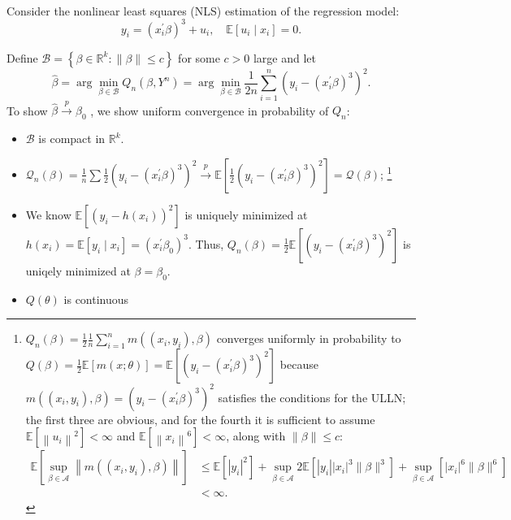 \begin{eg}
    \

    Consider the nonlinear least squares (NLS) estimation of the regression model:
    \[y_{i}=\left(x_{i}^{\prime} \beta\right)^{3}+u_{i}, \quad \mathbb{E}\left[u_{i} \mid x_{i}\right]=0 .\]

    Define  $\mathscr{B}=\left\{\beta \in \mathbb{R}^{k}:\|\beta\| \leq c\right\}$ for some $c>0$ large and let
    \[
    \hat{\beta}=\arg \min _{\beta \in \mathscr{B}} Q_{n}\left(\beta, Y^{n}\right)=\arg \min _{\beta \in \mathcal{B}} \frac{1}{2 n} \sum_{i=1}^{n}\left(y_{i}-\left(x_{i}^{\prime} \beta\right)^{3}\right)^{2} .
    \]
    To show  $\hat{\beta} \xrightarrow{p} \beta_{0}$ , we show uniform convergence in probability of  $Q_{n}$:
    \begin{itemize}
        \item $\mathscr{B}$  is compact in $\mathbb{R}^{k}$.
        \item $\mathcal{Q}_n(\beta) = \frac{1}{n} \sum \frac{1}{2} \left(y_i - (x_i^{\prime} \beta)^3\right)^2 \overset{p}{\rightarrow} \mathbb{E}\left[\frac{1}{2} \left(y_i - (x_i^{\prime} \beta)^3\right)^2 \right] = \mathcal{Q} (\beta)$;
        \footnote{$Q_{n}(\beta)=\frac{1}{2} \frac{1}{n} \sum_{i=1}^{n} m\left(\left(x_{i}, y_{i}\right), \beta\right)$ converges uniformly in probability to 
        $Q(\beta)=\frac{1}{2} \mathbb{E}[m(x ; \theta)]=   \mathbb{E}\left[\left(y_{i}-\left(x_{i}^{\prime} \beta\right)^{3}\right)^{2}\right]$
        because $m\left(\left(x_{i}, y_{i}\right), \beta\right)=\left(y_{i}-\left(x_{i}^{\prime} \beta\right)^{3}\right)^{2}$  satisfies the conditions for the ULLN; 
        the first three are obvious, and for the fourth it is sufficient to assume $\mathbb{E}\left[\left\|u_{i}\right\|^{2}\right]<\infty$ and $\mathbb{E}\left[\left\|x_{i}\right\|^{6}\right]<\infty$, along with $\|\beta\| \leq c$:
        \begin{align*}
            \mathbb{E}\left[\sup _{\beta \in \mathscr{A}}\left\|m\left(\left(x_{i}, y_{i}\right), \beta\right)\right\|\right] &\leqslant \mathbb{E}\left[\left|y_{i}\right|^{2}\right]+\sup _{\beta \in \mathscr{A}} 2 \mathbb{E}\left[\left|y_{i}\right|\left|x_{i}\right|^{3}\|\beta\|^{3}\right]+\sup _{\beta \in \mathscr{A}}\left[\left|x_{i}\right|^{6}\|\beta\|^{6}\right] \\
            &<\infty .
        \end{align*}
        }
        \item We know $\mathbb{E}\left[\left(y_{i}-h\left(x_{i}\right)\right)^{2}\right]$ is uniquely minimized at $h\left(x_{i}\right)=\mathbb{E}\left[y_{i} \mid x_{i}\right]=\left(x_{i}^{\prime} \beta_{0}\right)^{3}$.
        Thus, $Q_{n}(\beta)=\frac{1}{2} \mathbb{E}\left[\left(y_{i}-\left(x_{i}^{\prime} \beta\right)^{3}\right)^{2}\right]$ is uniqely minimized at $\beta=\beta_{0}$.
        \item $Q(\theta)$ is continuous
    \end{itemize}
\end{eg}

